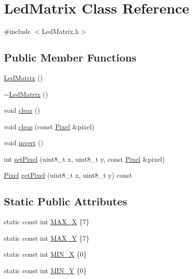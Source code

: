 \hypertarget{class_led_matrix}{}\section{Led\+Matrix Class Reference}
\label{class_led_matrix}


{\ttfamily \#include $<$Led\+Matrix.\+h$>$}

\subsection*{Public Member Functions}
\begin{DoxyCompactItemize}
\item 
\hyperlink{class_led_matrix_a2604720ce8497f9c84ad3b327629072d}{Led\+Matrix} ()
\item 
\hyperlink{class_led_matrix_a8faf8a7d51221ee711b8f0998e2a03ed}{$\sim$\+Led\+Matrix} ()
\item 
void \hyperlink{class_led_matrix_a2737d95498692cc098be8edc8937ada6}{clear} ()
\item 
void \hyperlink{class_led_matrix_ac9de9b5c9b37f13a1d9eec2d3d7970ed}{clear} (const \hyperlink{class_pixel}{Pixel} \&pixel)
\item 
void \hyperlink{class_led_matrix_af1e9e51216169ec51398b259129de5e1}{invert} ()
\item 
int \hyperlink{class_led_matrix_a00eb3db37486902ee8509a95c1ac09fe}{set\+Pixel} (uint8\+\_\+t x, uint8\+\_\+t y, const \hyperlink{class_pixel}{Pixel} \&pixel)
\item 
\hyperlink{class_pixel}{Pixel} \hyperlink{class_led_matrix_a7f46ff6f7d413db5ac77225d47219397}{get\+Pixel} (uint8\+\_\+t x, uint8\+\_\+t y) const 
\end{DoxyCompactItemize}
\subsection*{Static Public Attributes}
\begin{DoxyCompactItemize}
\item 
static const int \hyperlink{class_led_matrix_a6da341535a246a5395b0a46569618830}{M\+A\+X\+\_\+X} \{7\}
\item 
static const int \hyperlink{class_led_matrix_aa6cf03e172a1efe233aaac293be202bd}{M\+A\+X\+\_\+Y} \{7\}
\item 
static const int \hyperlink{class_led_matrix_a30e3af90d4c9a83aec44e71914f86aa3}{M\+I\+N\+\_\+X} \{0\}
\item 
static const int \hyperlink{class_led_matrix_a4bb052cfec297bc54387decb20a0f17f}{M\+I\+N\+\_\+Y} \{0\}
\end{DoxyCompactItemize}


